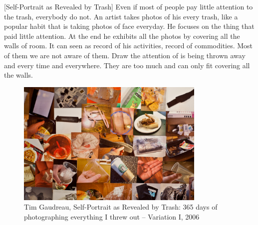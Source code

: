 %
[Self-Portrait as Revealed by Trash] Even if most of people pay little attention to the trash, everybody do not. An artist takes photos of his every trash, like a popular habit that is taking photos of face everyday. He focuses on the thing that paid little attention. At the end he exhibits all the photos by covering all the walls of room. It can seen as record of his activities, record of commodities. Most of them we are not aware of them. Draw the attention of is being thrown away and every time and everywhere. They are too much and can only fit covering all the walls.  



\begin{figure}[h!]
  \centering
  \includegraphics[height=6cm]{graphics/TimGaudreau_SelfPotraitRevealedByTrash.jpg}
  \caption{Tim Gaudreau, Self-Portrait as Revealed by Trash: 365 days of photographing everything I threw out – Variation I, 2006}
  \label{fig:TimGaudreau_SelfPotraitRevealedByTrash}
\end{figure}






